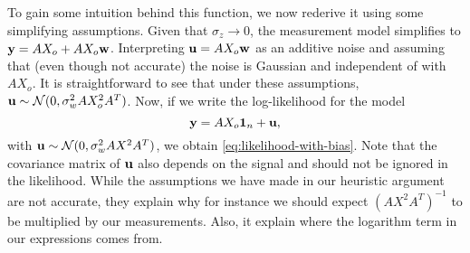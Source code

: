 \documentclass[onecolumn]{IEEEtran}
\newcommand{\wv}{{\bf w}}
\begin{document}
\begin{itemize}
To gain some intuition behind this function, we now rederive it using some simplifying assumptions. Given that $\sigma_z \rightarrow 0$, the measurement model simplifies to $\yv= AX_o + AX_o\wv$. Interpreting  $ \uv= AX_o \wv$ as an additive noise and assuming  that (even though not accurate) the  noise is Gaussian and  independent of  with $AX_o$. It is straightforward to see that under these assumptions, ${\bf u} \sim \mathcal{N}(0, \sigma_w^2 AX_o^2A^T)$. Now, if we write the log-likelihood for the model
\[
{\bf y}= AX_o\mathbf{1}_n+ {\bf u}, 
\]
with ${\bf u} \sim \mathcal{N}(0, \sigma_w^2 AX^2A^T)$, we obtain \eqref{eq:likelihood-with-bias}. Note that the covariance matrix of ${\bf u}$ also depends on the signal and should not be ignored in the likelihood. While the assumptions we have made in our heuristic argument are not accurate, they explain why for instance we should expect $(AX^2A^T)^{-1}$ to be multiplied by our measurements. Also, it explain where the logarithm term in our expressions comes from.  







%
%




\end{itemize}
\end{document}
